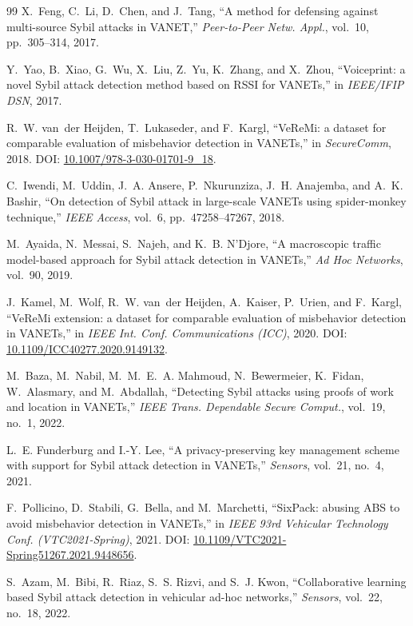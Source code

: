 \begin{thebibliography}{99}
 X.~Feng, C.~Li, D.~Chen, and J.~Tang, ``A method for defensing against multi-source Sybil attacks in VANET,'' \emph{Peer-to-Peer Netw. Appl.}, vol.~10, pp.~305--314, 2017.

 Y.~Yao, B.~Xiao, G.~Wu, X.~Liu, Z.~Yu, K.~Zhang, and X.~Zhou, ``Voiceprint: a novel Sybil attack detection method based on RSSI for VANETs,'' in \emph{IEEE/IFIP DSN}, 2017.

 R.~W. van~der Heijden, T.~Lukaseder, and F.~Kargl, ``VeReMi: a dataset for comparable evaluation of misbehavior detection in VANETs,'' in \emph{SecureComm}, 2018. DOI: \url{10.1007/978-3-030-01701-9\_18}.

 C.~Iwendi, M.~Uddin, J.~A. Ansere, P.~Nkurunziza, J.~H. Anajemba, and A.~K. Bashir, ``On detection of Sybil attack in large-scale VANETs using spider-monkey technique,'' \emph{IEEE Access}, vol.~6, pp.~47258--47267, 2018.

 M.~Ayaida, N.~Messai, S.~Najeh, and K.~B. N'Djore, ``A macroscopic traffic model-based approach for Sybil attack detection in VANETs,'' \emph{Ad Hoc Networks}, vol.~90, 2019.

 J.~Kamel, M.~Wolf, R.~W. van~der Heijden, A.~Kaiser, P.~Urien, and F.~Kargl, ``VeReMi extension: a dataset for comparable evaluation of misbehavior detection in VANETs,'' in \emph{IEEE Int. Conf. Communications (ICC)}, 2020. DOI: \url{10.1109/ICC40277.2020.9149132}.

 M.~Baza, M.~Nabil, M.~M.~E.~A. Mahmoud, N.~Bewermeier, K.~Fidan, W.~Alasmary, and M.~Abdallah, ``Detecting Sybil attacks using proofs of work and location in VANETs,'' \emph{IEEE Trans. Dependable Secure Comput.}, vol.~19, no.~1, 2022.

 L.~E. Funderburg and I.-Y. Lee, ``A privacy-preserving key management scheme with support for Sybil attack detection in VANETs,'' \emph{Sensors}, vol.~21, no.~4, 2021.

 F.~Pollicino, D.~Stabili, G.~Bella, and M.~Marchetti, ``SixPack: abusing ABS to avoid misbehavior detection in VANETs,'' in \emph{IEEE 93rd Vehicular Technology Conf. (VTC2021-Spring)}, 2021. DOI: \url{10.1109/VTC2021-Spring51267.2021.9448656}.

 S.~Azam, M.~Bibi, R.~Riaz, S.~S. Rizvi, and S.~J. Kwon, ``Collaborative learning based Sybil attack detection in vehicular ad-hoc networks,'' \emph{Sensors}, vol.~22, no.~18, 2022.


\end{thebibliography}
